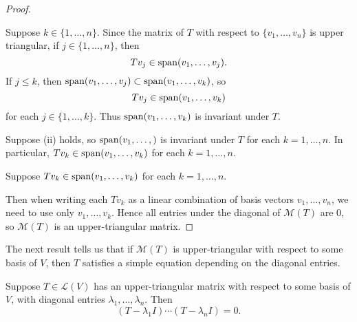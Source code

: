 \begin{proof} \

 Suppose $k\in\{1,\dots,n\}$. Since the matrix of $T$ with respect to $\{v_1,\dots,v_n\}$ is upper triangular, if $j\in\{1,\dots,n\}$, then
\[Tv_j\in\operatorname{span}(v_1,\dots,v_j).\]
If $j\le k$, then $\operatorname{span}(v_1,\dots,v_j)\subset\operatorname{span}(v_1,\dots,v_k)$, so
\[Tv_j\in\operatorname{span}(v_1,\dots,v_k)\]
for each $j\in\{1,\dots,k\}$. Thus $\operatorname{span}(v_1,\dots,v_k)$ is invariant under $T$.

 Suppose (ii) holds, so $\operatorname{span}(v_1,\dots,)$ is invariant under $T$ for each $k=1,\dots,n$. In particular, $Tv_k\in\operatorname{span}(v_1,\dots,v_k)$ for each $k=1,\dots,n$.

 Suppose $Tv_k\in\operatorname{span}(v_1,\dots,v_k)$ for each $k=1,\dots,n$.

Then when writing each $Tv_k$ as a linear combination of basis vectors $v_1,\dots,v_n$, we need to use only $v_1,\dots,v_k$. 
Hence all entries under the diagonal of $\mathcal{M}(T)$ are $0$, so $\mathcal{M}(T)$ is an upper-triangular matrix.
\end{proof}

The next result tells us that if $\mathcal{M}(T)$ is upper-triangular with respect to some basis of $V$, then $T$ satisfies a simple equation depending on the diagonal entries.

\begin{proposition}\label{prop:upper-triangular-equation-diagonal-entries}
Suppose $T\in\mathcal{L}(V)$ has an upper-triangular matrix with respect to some basis of $V$, with diagonal entries $\lambda_1,\dots,\lambda_n$. Then
\begin{equation}
(T-\lambda_1 I)\cdots(T-\lambda_n I)=0.
\end{equation}
\end{proposition}

